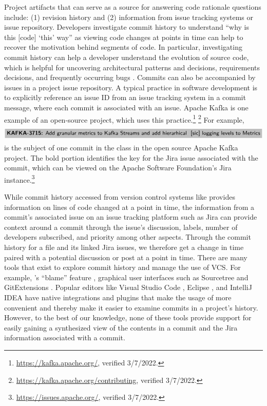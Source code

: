 Project artifacts that can serve as a source for answering code rationale questions include: (1) revision history and (2) information from issue tracking systems or issue repository. 
Developers investigate commit history to understand ``why is this [code] ‘this’ way'' as viewing code changes at points in time can help to recover the motivation behind segments of code.
In particular, investigating commit history can help a developer understand the evolution of source code, which is helpful for uncovering architectural patterns and decisions, requirements decisions, and frequently occurring bugs \cite{codoban_software_2015}.
Commits can also be accompanied by issues in a project issue repository. 
A typical practice in software development is to explicitly reference an issue ID from an issue tracking system in a commit message, where each commit is associated with an issue. Apache Kafka is one example of an open-source project, which uses this practice.\footnote{\url{https://kafka.apache.org/}, verified 3/7/2022.} \footnote{\url{https://kafka.apache.org/contributing}, verified 3/7/2022.}
For example, 
$$
\colorbox{lightgray}{\jira{KAFKA-3715:}{Add granular metrics to Kafka Streams and add hierarhical \sic logging levels to Metrics}}
$$
is the subject of one commit in the  class in the open source Apache Kafka project. The bold portion identifies the key for the Jira issue associated with the commit, which can be viewed on the Apache Software Foundation's Jira instance.\footnote{\url{https://issues.apache.org/}, verified 3/7/2022.}

While commit history accessed from version control systems like  provides information on lines of code changed at a point in time, the information from a commit's associated issue on an issue tracking platform such as Jira \cite{jira} can provide context around a commit through the issue's discussion, labels, number of developers subscribed, and priority among other aspects.
Through the commit history for a file and its linked Jira issues, we therefore get a change in time paired with a potential discussion or post at a point in time.
There are many tools that exist to explore commit history and manage the use of VCS. 
For example, 's ``blame'' feature \cite{gitblame}, graphical user interfaces such as Sourcetree \cite{sourcetree} and GitExtensions \cite{gitextensions}. 
Popular editors like Visual Studio Code \cite{vscode}, Eclipse \cite{eclipse}, and IntelliJ IDEA \cite{intellij} have native  integrations and plugins that make the usage of  more convenient and thereby make it easier to examine commits in a project's history. 
However, to the best of our knowledge, none of these tools provide support for easily gaining a synthesized view of the contents in a commit and the Jira information associated with a commit.

